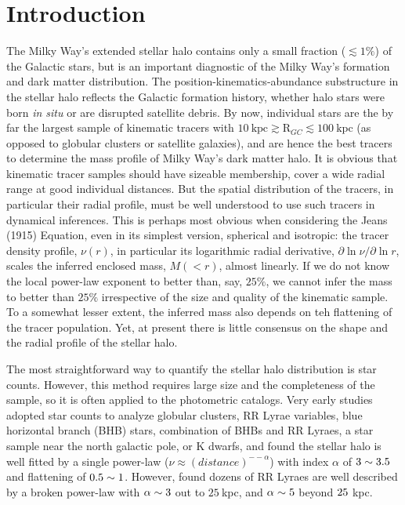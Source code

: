 \documentclass[12pt,preprint]{aastex}
\newcommand{\rgc}{\ensuremath{\mathrm{R}_{GC}}}
\begin{document}

\section{Introduction}
The Milky Way's extended stellar halo contains only a small fraction ($\lesssim 1\%$) of the Galactic stars, but is an important diagnostic of the Milky Way's formation and dark matter distribution. The position-kinematics-abundance substructure in the stellar halo reflects the Galactic formation history, whether halo stars were born \textit{in situ} or are disrupted satellite debris. By now, individual stars are the by far the largest sample of 
kinematic tracers with 
$10~\mathrm{kpc}\gtrsim \rgc\lesssim 100~\mathrm{kpc}$  (as opposed to globular clusters or satellite galaxies), and are hence the best tracers to determine the mass profile of Milky Way's dark matter halo. It is obvious that kinematic tracer samples should have sizeable membership, cover a wide radial range at good individual distances. But the spatial distribution of the tracers, in particular their radial profile, must be well understood to use such tracers in dynamical inferences. This is perhaps most obvious when considering the Jeans (1915) Equation, even in its simplest version, spherical and isotropic:  the tracer
density profile, $\nu (r)$, in particular its logarithmic radial derivative, 
$\partial{\ln \nu}/\partial{\ln r}$, scales the inferred enclosed mass, $M(<r)$, almost linearly.
If we do not know the local power-law exponent to better than, say, $25\%$, we cannot 
infer the mass to better than $25\%$ irrespective of the size and quality of the kinematic sample. To a somewhat lesser extent, the inferred mass also depends on teh flattening of the tracer population. Yet, at present  there is little consensus on the shape and the radial profile of the stellar halo.

The most straightforward way to quantify the stellar halo distribution is star counts. However, this method requires large size and the completeness of the sample, so it is often applied to the photometric catalogs. Very early studies adopted star counts to analyze globular clusters\citep{Harris1976}, RR Lyrae variables\citep{Hawkins1984,Wetterer1996}, blue horizontal branch (BHB) stars\citep{Sommer-Larsen1987}, combination of BHBs and RR Lyraes\citep{Sluis1998}, a star sample near the north galactic pole\citep{Soubiran1993}, or K dwarfs\citep{Gould1998}, and found the stellar halo is well fitted by a single power-law ($\nu \approx (distance)^{−-\alpha}$) with index $\alpha$ of $\rm 3\sim3.5$ and flattening of $\rm 0.5\sim1$. However, \citet{Saha1985} found dozens of RR Lyraes are well described by a broken power-law with $\rm \alpha \sim 3$ out to $25~$kpc, and $\rm \alpha \sim 5$ beyond $\rm 25~$kpc.
\end{document}
